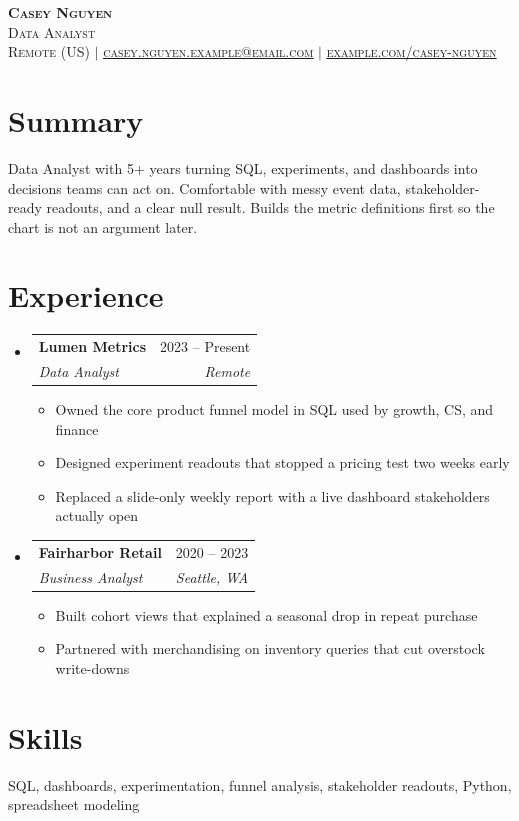 \documentclass[letterpaper,11pt]{article}
\makeatletter
\newcommand{\resumeItem}[1]{\item\small{#1 \vspace{2pt}}}
\newcommand{\resumeSubheading}[4]{
  \vspace{-2pt}\item
  \begin{tabular*}{0.97\textwidth}[t]{l@{\extracolsep{\fill}}r}
    \textbf{#1} & #2 \\
    \textit{\small#3} & \textit{\small #4} \\
  \end{tabular*}\vspace{-7pt}
}
\newcommand{\resumeSubHeadingListStart}{\begin{itemize}[leftmargin=0.15in, label={}]}
\newcommand{\resumeSubHeadingListEnd}{\end{itemize}}
\newcommand{\resumeItemListStart}{\begin{itemize}}
\newcommand{\resumeItemListEnd}{\end{itemize}\vspace{-5pt}}
\makeatother
\begin{document}
\begin{center}
  \textbf{\Huge \scshape Casey Nguyen} \\ \vspace{2pt}
  \small \scshape Data Analyst \\ \vspace{8pt}
  \footnotesize Remote (US)
  \enspace$\vert$\enspace
  \href{mailto:casey.nguyen.example@email.com}{\underline{casey.nguyen.example@email.com}}
  \enspace$\vert$\enspace
  \href{https://example.com/casey-nguyen}{\underline{example.com/casey-nguyen}}
\end{center}

\section{Summary}
\small{
Data Analyst with 5+ years turning SQL, experiments, and dashboards into decisions teams can act on.
Comfortable with messy event data, stakeholder-ready readouts, and a clear null result.
Builds the metric definitions first so the chart is not an argument later.
}

\section{Experience}
\resumeSubHeadingListStart
  \resumeSubheading
  {Lumen Metrics}{2023 -- Present}
  {Data Analyst}{Remote}
  \resumeItemListStart
    \resumeItem{Owned the core product funnel model in SQL used by growth, CS, and finance}
    \resumeItem{Designed experiment readouts that stopped a pricing test two weeks early}
    \resumeItem{Replaced a slide-only weekly report with a live dashboard stakeholders actually open}
  \resumeItemListEnd
  \resumeSubheading
  {Fairharbor Retail}{2020 -- 2023}
  {Business Analyst}{Seattle, WA}
  \resumeItemListStart
    \resumeItem{Built cohort views that explained a seasonal drop in repeat purchase}
    \resumeItem{Partnered with merchandising on inventory queries that cut overstock write-downs}
  \resumeItemListEnd
\resumeSubHeadingListEnd

\section{Skills}
\small{SQL, dashboards, experimentation, funnel analysis, stakeholder readouts, Python, spreadsheet modeling}
\end{document}
